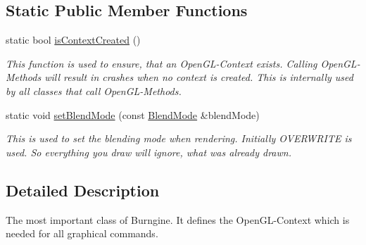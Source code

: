\subsection*{Static Public Member Functions}
\begin{DoxyCompactItemize}
\item 
static bool \hyperlink{classburn_1_1_window_ab5f58992b7d89ca04c57516bd128780c}{is\-Context\-Created} ()
\begin{DoxyCompactList}\small\item\em This function is used to ensure, that an Open\-G\-L-\/\-Context exists. Calling Open\-G\-L-\/\-Methods will result in crashes when no context is created. This is internally used by all classes that call Open\-G\-L-\/\-Methods. \end{DoxyCompactList}\item 
static void \hyperlink{classburn_1_1_window_a8398c823ad79ab6c2a300f021ff556b6}{set\-Blend\-Mode} (const \hyperlink{classburn_1_1_window_ab964403748eb7540e38e649e81711da3}{Blend\-Mode} \&blend\-Mode)
\begin{DoxyCompactList}\small\item\em This is used to set the blending mode when rendering. Initially O\-V\-E\-R\-W\-R\-I\-T\-E is used. So everything you draw will ignore, what was already drawn. \end{DoxyCompactList}\end{DoxyCompactItemize}


\subsection{Detailed Description}
The most important class of Burngine. It defines the Open\-G\-L-\/\-Context which is needed for all graphical commands. 

